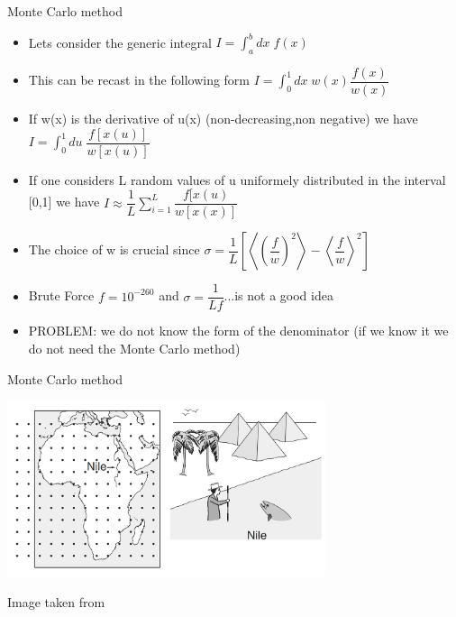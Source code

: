 \documentclass{beamer}
\begin{document}
\begin{frame}{Monte Carlo method \cite{frenkel2001understanding}}
\begin{itemize}
\item Lets consider the generic integral $I=\int^{b}_{a}dx\;f(x)$
\item This can be recast in the following form  $I=\int^{1}_{0}dx\;w(x)\dfrac{f(x)}{w(x)}$
\item If w(x) is the derivative of u(x) (non-decreasing,non negative) we have $I=\int^{1}_{0}du\;\dfrac{f[x(u)]}{w[x(u)]}$
\item If one considers L random values of u uniformely distributed in the interval [0,1] we have $I\approx\dfrac{1}{L}\sum_{i=1}^{L}\dfrac{f[x(u)}{w[x(x)]}$
 \item The choice of w is crucial since $\sigma=\dfrac{1}{L}\left[\left\langle\left(\dfrac{f}{w}\right)^{2}\right\rangle-  \left\langle\dfrac{f}{w}\right\rangle^{2}\right]$
 \item Brute Force $f=10^{-260}$ and $\sigma=\dfrac{1}{Lf}$...is not a good idea
 \item PROBLEM: we do not know the form of the denominator (if we know it we do not need the Monte Carlo method)


\end{itemize}
\end{frame}


\begin{frame} {Monte Carlo method \cite{peliti2011statistical}}

 \begin{center}
     \includegraphics[width=0.7\textwidth]{Pic/Pic_river.png}
\end{center}
 \begin{center}
Image taken from \cite{frenkel2001understanding}
\end{center}
\end{frame}
\end{document}
